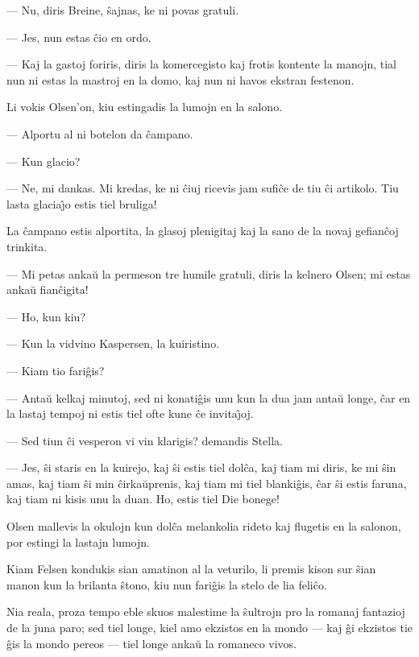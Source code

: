  --- Nu, diris Breine, \^sajnas, ke ni povas gratuli.

 --- Jes, nun estas \^cio en ordo.

 --- Kaj la gastoj foriris, diris la komercegisto kaj frotis kontente
la manojn, tial nun ni estas la mastroj en la domo, kaj nun ni havos
ekstran festenon.

   Li vokis Olsen'on, kiu estingadis la lumojn en la salono.

 --- Alportu al ni botelon da \^campano.

 --- Kun glacio?

 --- Ne, mi dankas. Mi kredas, ke ni \^ciuj ricevis jam sufi\^ce de tiu
\^ci artikolo. Tiu lasta glacia\^{\j}o estis tiel bruliga!

   La \^campano estis alportita, la glasoj plenigitaj kaj la sano de la
novaj gefian\^coj trinkita.

 --- Mi petas anka\u u la permeson tre humile gratuli, diris la kelnero
Olsen; mi estas anka\u u fian\^cigita!

 --- Ho, kun kiu?

 --- Kun la vidvino Kaspersen, la kuiristino.

 --- Kiam tio fari\^gis?

 --- Anta\u u kelkaj minutoj, sed ni konati\^gis unu kun la dua jam anta\u u
longe, \^car en la lastaj tempoj ni estis tiel ofte kune \^ce
invita\^{\j}oj.

 --- Sed tiun \^ci vesperon vi vin klarigis? demandis Stella.

 --- Jes, \^si staris en la kuirejo, kaj \^si estis tiel dol\^ca, kaj tiam
mi diris, ke mi \^sin amas, kaj tiam \^si min \^cirka\u uprenis, kaj
tiam mi tiel blanki\^gis, \^car \^si estis faruna, kaj tiam ni kisis
unu la duan. Ho, estis tiel Die bonege!

   Olsen mallevis la okulojn kun dol\^ca melankolia rideto kaj flugetis
en la salonon, por estingi la lastajn lumojn.

   Kiam Felsen kondukis sian amatinon al la veturilo, li premis kison
sur \^sian manon kun la brilanta \^stono, kiu nun fari\^gis la stelo
de lia feli\^co.

   Nia reala, proza tempo eble skuos malestime la \^sultrojn pro la
romanaj fantazioj de la juna paro; sed tiel longe, kiel amo ekzistos
en la mondo --- kaj \^gi ekzistos tie \^gis la mondo pereos --- tiel
longe anka\u u la romaneco vivos.

\smallrule{}
